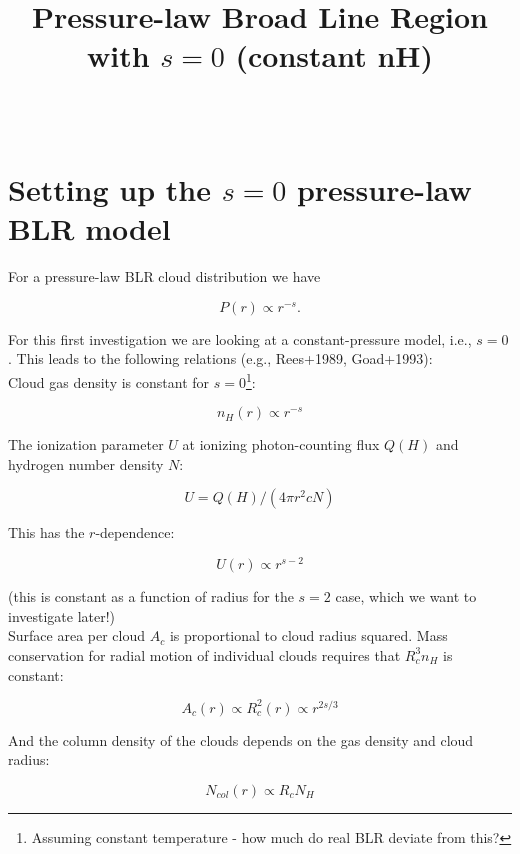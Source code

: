 \documentclass[paper=a4, fontsize=11pt]{scrartcl} %
\title{	
\normalfont \normalsize 
\textsc{} \\ [25pt] %
\horrule{0.5pt} \\[0.4cm] %
\huge Pressure-law Broad Line Region with $s=0$ (constant nH)\\ %
\horrule{2pt} \\[0.5cm] %
}
\numberwithin{equation}{section} %
\numberwithin{figure}{section} %
\numberwithin{table}{section} %
\begin{document}
\date{}
\maketitle

\section{Setting up the $s=0$ pressure-law BLR model}

For a pressure-law BLR cloud distribution we have

\begin{equation*}
P(r)\propto r^{-s}.
\end{equation*}

For this first investigation we are looking at a constant-pressure model, i.e., $s=0$. This leads to the following relations (e.g., Rees+1989, Goad+1993):\\

Cloud gas density is constant for $s=0$\footnote{Assuming constant temperature - how much do real BLR deviate from this?}:

\begin{equation*}
n_H(r)\propto r^{-s}
\end{equation*}

The ionization parameter $U$ at ionizing photon-counting flux $Q(H)$ and hydrogen number density $N$:

\begin{equation*}
U=Q(H)/(4\pi r^2cN)
\end{equation*}

This has the $r$-dependence:

\begin{equation*}
U(r)\propto r^{s-2}
\end{equation*}

(this is constant as a function of radius for the $s=2$ case, which we want to investigate later!)\\

Surface area per cloud $A_c$ is proportional to cloud radius squared. Mass conservation for radial motion of individual clouds requires that $R_c^3n_H$ is constant:

\begin{equation*}
A_c(r) \propto R_c^2(r) \propto r^{2s/3}
\end{equation*}

And the column density of the clouds depends on the gas density and cloud radius:

\begin{equation*}
N_{col}(r)\propto R_cN_H
\end{equation*}
\end{document}
